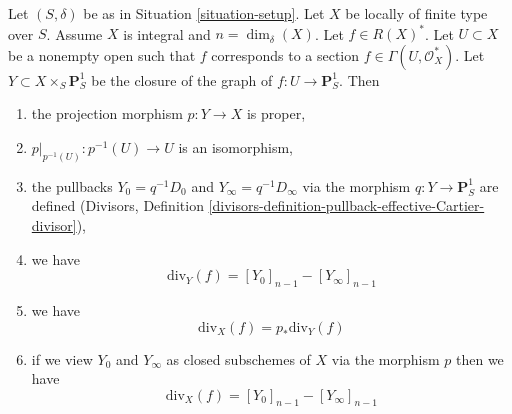 \begin{lemma}
\label{lemma-rational-function}
Let $(S, \delta)$ be as in Situation \ref{situation-setup}.
Let $X$ be locally of finite type over $S$. Assume $X$ is
integral and $n = \dim_\delta(X)$. Let $f \in R(X)^*$.
Let $U \subset X$ be a nonempty open such that $f$
corresponds to a section $f \in \Gamma(U, \mathcal{O}_X^*)$.
Let $Y \subset X \times_S \mathbf{P}^1_S$ be the
closure of the graph of $f : U \to \mathbf{P}^1_S$.
Then
\begin{enumerate}
\item the projection morphism $p : Y \to X$ is proper,
\item $p|_{p^{-1}(U)} : p^{-1}(U) \to U$ is an isomorphism,
\item the pullbacks $Y_0 = q^{-1}D_0$ and $Y_\infty = q^{-1}D_\infty$
via the morphism $q : Y \to \mathbf{P}^1_S$ are defined
(Divisors, Definition
\ref{divisors-definition-pullback-effective-Cartier-divisor}),
\item we have
$$
\text{div}_Y(f) = [Y_0]_{n - 1} - [Y_\infty]_{n - 1}
$$
\item we have
$$
\text{div}_X(f) = p_*\text{div}_Y(f)
$$
\item if we view $Y_0$ and $Y_\infty$ as closed subschemes of $X$
via the morphism $p$ then we have
$$
\text{div}_X(f) = [Y_0]_{n - 1} - [Y_\infty]_{n - 1}
$$
\end{enumerate}
\end{lemma}

